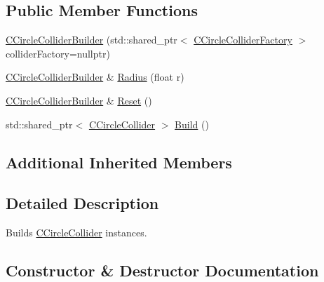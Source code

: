 \subsection*{Public Member Functions}
\begin{DoxyCompactItemize}
\item 
\hyperlink{classastu_1_1suite2d_1_1CCircleColliderBuilder_ad2a056e20fa1bb2ba7236125fc0a3aef}{C\+Circle\+Collider\+Builder} (std\+::shared\+\_\+ptr$<$ \hyperlink{classastu_1_1suite2d_1_1CCircleColliderFactory}{C\+Circle\+Collider\+Factory} $>$ collider\+Factory=nullptr)
\item 
\hyperlink{classastu_1_1suite2d_1_1CCircleColliderBuilder}{C\+Circle\+Collider\+Builder} \& \hyperlink{classastu_1_1suite2d_1_1CCircleColliderBuilder_ae75f2dcf4f2e99ed9ead657e661baa62}{Radius} (float r)
\item 
\hyperlink{classastu_1_1suite2d_1_1CCircleColliderBuilder}{C\+Circle\+Collider\+Builder} \& \hyperlink{classastu_1_1suite2d_1_1CCircleColliderBuilder_a0a946698baba5db84d97c648a79b224f}{Reset} ()
\item 
std\+::shared\+\_\+ptr$<$ \hyperlink{classastu_1_1suite2d_1_1CCircleCollider}{C\+Circle\+Collider} $>$ \hyperlink{classastu_1_1suite2d_1_1CCircleColliderBuilder_a50bb53e880b061f2040103cf8a1fe332}{Build} ()
\end{DoxyCompactItemize}
\subsection*{Additional Inherited Members}


\subsection{Detailed Description}
Builds \hyperlink{classastu_1_1suite2d_1_1CCircleCollider}{C\+Circle\+Collider} instances. 

\subsection{Constructor \& Destructor Documentation}
\mbox{\label{classastu_1_1suite2d_1_1CCircleColliderBuilder_ad2a056e20fa1bb2ba7236125fc0a3aef}} 
